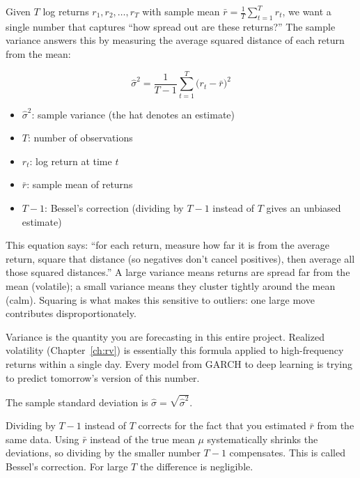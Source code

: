 \begin{definition}
Given $T$ log returns $r_1, r_2, \ldots, r_T$ with sample mean $\bar{r} = \frac{1}{T}\sum_{t=1}^T r_t$, we want a single number that captures ``how spread out are these returns?''
The sample variance answers this by measuring the average squared distance of each return from the mean:

\begin{equation}
  \hat{\sigma}^2 = \frac{1}{T-1}\sum_{t=1}^{T}\bigl(r_t - \bar{r}\bigr)^2
  \label{eq:sample-variance}
\end{equation}
\begin{itemize}[nosep]
  \item $\hat{\sigma}^2$: sample variance (the hat denotes an estimate)
  \item $T$: number of observations
  \item $r_t$: log return at time $t$
  \item $\bar{r}$: sample mean of returns
  \item $T-1$: Bessel's correction (dividing by $T-1$ instead of $T$ gives an unbiased estimate)
\end{itemize}

\begin{intuition}
This equation says: ``for each return, measure how far it is from the average return, square that distance (so negatives don't cancel positives), then average all those squared distances.''
A large variance means returns are spread far from the mean (volatile); a small variance means they cluster tightly around the mean (calm).
Squaring is what makes this sensitive to outliers: one large move contributes disproportionately.
\end{intuition}

\begin{projectconnection}
Variance is the quantity you are forecasting in this entire project.
Realized volatility (Chapter~\ref{ch:rv}) is essentially this formula applied to high-frequency returns within a single day.
Every model from GARCH to deep learning is trying to predict tomorrow's version of this number.
\end{projectconnection}

The sample standard deviation is $\hat{\sigma} = \sqrt{\hat{\sigma}^2}$.
\end{definition}

\begin{prereq}[Why $T-1$?]
Dividing by $T-1$ instead of $T$ corrects for the fact that you estimated $\bar{r}$ from the same data.
Using $\bar{r}$ instead of the true mean $\mu$ systematically shrinks the deviations, so dividing by the smaller number $T-1$ compensates.
This is called Bessel's correction.
For large $T$ the difference is negligible.
\end{prereq}

